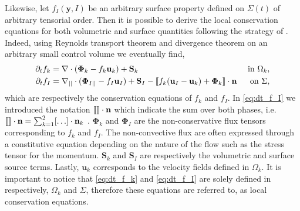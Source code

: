 Likewise, let $f_I(\textbf{y},I)$ be an arbitrary surface property defined on $\Sigma(t)$ of arbitrary tensorial order.
Then it is possible to derive the local conservation equations for both volumetric and surface quantities following the strategy of \citep{bothe2022sharp,morel2015mathematical,tignol1986modelisation,marle1982macroscopic} .
Indeed, using Reynolds transport theorem  and divergence theorem on an arbitrary small control volume we eventually find, 
\begin{align}
    \label{eq:dt_f_k}
    \partial_t f_k
    &= \mathbf{\nabla} \cdot \left(
        \mathbf{\Phi}_k
        - f_k\textbf{u}_k
        \right)
    + \textbf{S}_k
    & \text{ in } \Omega_k,&\\
    \partial_t f_I  
    &= 
    \mathbf{\nabla}_{||} \cdot (\mathbf{\Phi}_{I||} - f_I \textbf{u}_I)
    + \textbf{S}_I
    - \llbracket 
        f_k (\textbf{u}_I - \textbf{u}_k)
        + \mathbf{\Phi}_k
      \rrbracket \cdot \textbf{n} 
    & \text{ on } \Sigma,&
    \label{eq:dt_f_I}
\end{align}
which are respectively the conservation equations of $f_k$ and $f_I$.
In \ref{eq:dt_f_I} we introduced the notation $\llbracket  \rrbracket \cdot \textbf{n}$ which indicate the sum over both phases, i.e. $\llbracket  \rrbracket \cdot \textbf{n} = \sum_{k=1}^2 [\ldots] \cdot \textbf{n}_k$ . 
  $\mathbf{\Phi}_k$ and $\mathbf{\Phi}_I$ are the non-conservative flux tensors corresponding to $f_k$ and $f_I$. 
The non-convective flux are often expressed through a constitutive equation depending on the nature of the flow such as the stress tensor for the momentum. 
$\textbf{S}_k$ and $\textbf{S}_I$ are respectively the volumetric and surface source terms.%
Lastly, $\textbf{u}_k$ corresponds to the velocity fields defined in $\Omega_k$. 
It is important to notice that \ref{eq:dt_f_k} and \ref{eq:dt_f_I} are solely defined in respectively, $\Omega_k$ and $\Sigma$, therefore these equations are referred to, as local conservation equations.


